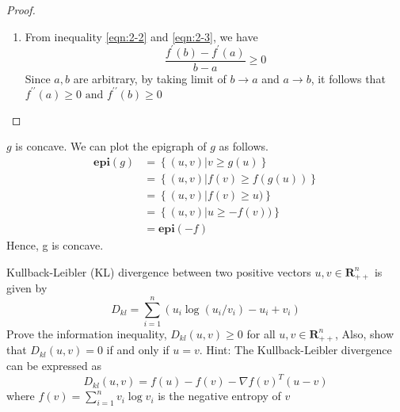 {\begin{proof}
\begin{enumerate}
\item{
From inequality \ref{eqn:2-2} and \ref{eqn:2-3}, we have
\begin{equation}
\frac{f^{\prime}(b)-f^{\prime}(a)}{b-a} \geq 0
\end{equation}
Since $a,b$ are arbitrary, by taking limit of $b \rightarrow a$ and $a \rightarrow b$, it follows that $f^{\prime \prime}(a) \geq 0 \text { and } f^{\prime \prime}(b) \geq 0 $

}

\end{enumerate}

\end{proof}


\begin{solution}
$g$ is concave. We can plot the epigraph of $g$ as follows.
\begin{equation}
\begin{aligned}
\mathbf{epi} (g) &= \left\{(u,v) | v \geq g(u)\right\} \\
&= \left\{(u,v) |f(v) \geq f(g(u)) \right\} \\
&= \left\{(u,v) |f(v) \geq u) \right\} \\
&= \left\{(u,v) |u \geq -f(v)) \right\} \\
&= \mathbf{epi} (-f)
\end{aligned}
\end{equation}
Hence, g is concave.
\end{solution}

\exercise
{Kullback-Leibler (KL) divergence between two positive vectors $u, v \in \mathbf{R}_{++}^{n}$ is given by
$$
D_{k l}=\sum_{i=1}^{n}\left(u_{i} \log \left(u_{i} / v_{i}\right)-u_{i}+v_{i}\right)
$$
Prove the information inequality, $D_{k l}(u, v) \geq 0$ for all $u, v \in \mathbf{R}_{++}^{n}$, Also, show that $D_{k l}(u, v)=0$ if and only if $ u = v$. Hint: The Kullback-Leibler divergence can be expressed as $$
D_{k l}(u, v)=f(u)-f(v)-\nabla f(v)^{T}(u-v)
$$
where $f(v)=\sum_{i=1}^{n} v_{i} \log v_{i}$ is the negative entropy of $v$
}

}
